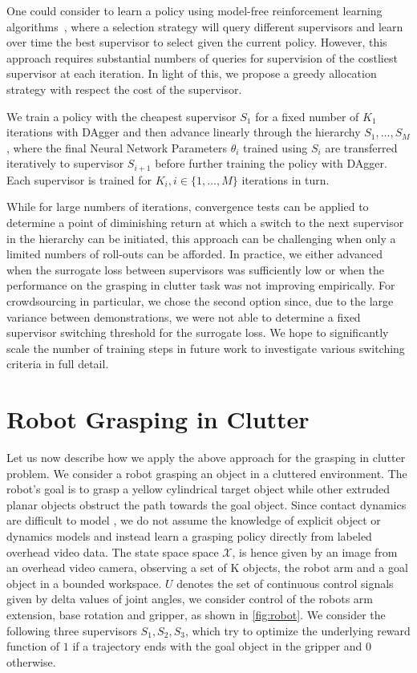 \documentclass[10pt, conference]{ieeeconf}      %
\begin{document}
One could consider to learn a policy using model-free reinforcement learning algorithms~\cite{sutton1998reinforcement}, where a selection strategy will query different supervisors and learn over time the
best supervisor to select given the current policy. However, this approach requires substantial numbers of 
queries for supervision of the costliest supervisor at each iteration. In light of this, we propose a greedy allocation
strategy with respect the cost of the supervisor.

We train a policy with the cheapest supervisor $S_1$ for a fixed number of $K_1$ iterations with DAgger and then advance
linearly through the hierarchy $S_1, \ldots, S_M$, where the final Neural Network Parameters $\theta_i$ trained using
$S_i$ are transferred iteratively to supervisor $S_{i+1}$ before further training the policy with DAgger.
Each supervisor is trained for $K_i, i\in \{1, \ldots, M\}$ iterations in turn. 

While for large numbers of iterations, convergence tests can be applied to determine a point of diminishing return at
which a switch to the next supervisor in the hierarchy can be initiated, this approach can be challenging when only a
limited numbers of roll-outs can be afforded. In practice, we either advanced when the surrogate loss between
supervisors was sufficiently low or when the performance on the grasping in clutter task was not improving empirically. 
For crowdsourcing in particular, we chose the second option since, due to the large variance between demonstrations,
we were not able to determine a fixed supervisor switching threshold for the surrogate loss. We hope to significantly scale the number of
training steps in future work to investigate various switching criteria in full detail.




\section{Robot Grasping in Clutter}\label{sec:sys}
Let us now describe how we apply the above approach for the grasping in clutter problem. We consider a robot grasping an
object in a cluttered environment. The robot's goal is to grasp a yellow cylindrical target object while other extruded
planar objects obstruct the path towards the goal object. Since contact dynamics are difficult to model \cite{kitaevphysics,kingnonprehensile}, we do not assume the knowledge of explicit object or dynamics models and instead learn a grasping policy directly from labeled
overhead video data. The state space space $\mathcal{X}$, is hence given by an image from an overhead video
camera, observing a set of K objects, the robot arm and a goal object in a bounded workspace. $U$ denotes the set of continuous control
signals given by delta values of joint angles, we consider control of the robots arm extension, base rotation and gripper, as shown in \ref{fig:robot}. We consider the following three supervisors $S_1, S_2, S_3$, which try to optimize the underlying reward
function of $1$ if a trajectory ends with the goal object in the gripper and $0$ otherwise.
\end{document}
